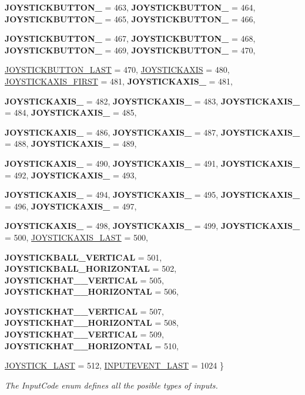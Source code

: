 \begin{DoxyCompactItemize}
{\bfseries JOYSTICKBUTTON\_} =  463, 
{\bfseries JOYSTICKBUTTON\_} =  464, 
{\bfseries JOYSTICKBUTTON\_} =  465, 
{\bfseries JOYSTICKBUTTON\_} =  466, 
\par
{\bfseries JOYSTICKBUTTON\_} =  467, 
{\bfseries JOYSTICKBUTTON\_} =  468, 
{\bfseries JOYSTICKBUTTON\_} =  469, 
{\bfseries JOYSTICKBUTTON\_} =  470, 
\par
\hyperlink{classphys_1_1MetaCode_a3e501cbb5bf0f6f1fdb7211465bda8d8a527375f3b27437b82cffd7c5fc2a14ac}{JOYSTICKBUTTON\_\-LAST} =  470, 
\hyperlink{classphys_1_1MetaCode_a3e501cbb5bf0f6f1fdb7211465bda8d8ab4e0e44b1cad95e292e9e436f3e59e0a}{JOYSTICKAXIS} =  480, 
\hyperlink{classphys_1_1MetaCode_a3e501cbb5bf0f6f1fdb7211465bda8d8a25c2eaee4c0cbf93209042779b1e2e99}{JOYSTICKAXIS\_\-FIRST} =  481, 
{\bfseries JOYSTICKAXIS\_} =  481, 
\par
{\bfseries JOYSTICKAXIS\_} =  482, 
{\bfseries JOYSTICKAXIS\_} =  483, 
{\bfseries JOYSTICKAXIS\_} =  484, 
{\bfseries JOYSTICKAXIS\_} =  485, 
\par
{\bfseries JOYSTICKAXIS\_} =  486, 
{\bfseries JOYSTICKAXIS\_} =  487, 
{\bfseries JOYSTICKAXIS\_} =  488, 
{\bfseries JOYSTICKAXIS\_} =  489, 
\par
{\bfseries JOYSTICKAXIS\_} =  490, 
{\bfseries JOYSTICKAXIS\_} =  491, 
{\bfseries JOYSTICKAXIS\_} =  492, 
{\bfseries JOYSTICKAXIS\_} =  493, 
\par
{\bfseries JOYSTICKAXIS\_} =  494, 
{\bfseries JOYSTICKAXIS\_} =  495, 
{\bfseries JOYSTICKAXIS\_} =  496, 
{\bfseries JOYSTICKAXIS\_} =  497, 
\par
{\bfseries JOYSTICKAXIS\_} =  498, 
{\bfseries JOYSTICKAXIS\_} =  499, 
{\bfseries JOYSTICKAXIS\_} =  500, 
\hyperlink{classphys_1_1MetaCode_a3e501cbb5bf0f6f1fdb7211465bda8d8a8429dc92596989463fabd62deed05fae}{JOYSTICKAXIS\_\-LAST} =  500, 
\par
{\bfseries JOYSTICKBALL\_\-VERTICAL} =  501, 
{\bfseries JOYSTICKBALL\_\-HORIZONTAL} =  502, 
{\bfseries JOYSTICKHAT\_\_\-VERTICAL} =  505, 
{\bfseries JOYSTICKHAT\_\_\-HORIZONTAL} =  506, 
\par
{\bfseries JOYSTICKHAT\_\_\-VERTICAL} =  507, 
{\bfseries JOYSTICKHAT\_\_\-HORIZONTAL} =  508, 
{\bfseries JOYSTICKHAT\_\_\-VERTICAL} =  509, 
{\bfseries JOYSTICKHAT\_\_\-HORIZONTAL} =  510, 
\par
\hyperlink{classphys_1_1MetaCode_a3e501cbb5bf0f6f1fdb7211465bda8d8afa71c1a74177cf69c80c08a010b97dff}{JOYSTICK\_\-LAST} =  512, 
\hyperlink{classphys_1_1MetaCode_a3e501cbb5bf0f6f1fdb7211465bda8d8adc78bfd04a85c4bbe39718f9acacbbe3}{INPUTEVENT\_\-LAST} =  1024
 \}
\begin{DoxyCompactList}\small\item\em The InputCode enum defines all the posible types of inputs. \item\end{DoxyCompactList}\end{DoxyCompactItemize}
